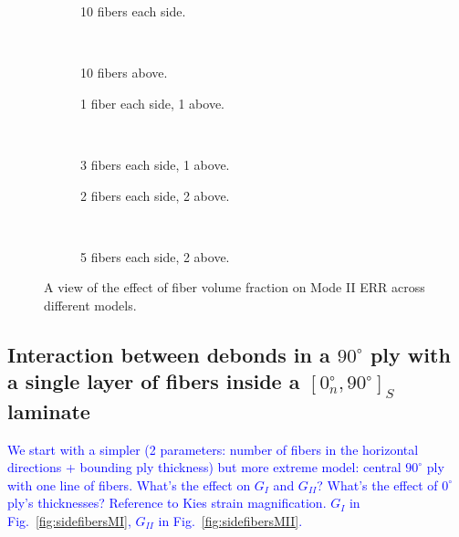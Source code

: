 \documentclass[review]{elsarticle}
\begin{document}
\begin{figure}[!h]
    \begin{subfigure}[b]{0.45\textwidth}
        \caption{10 fibers each side.}\label{subfig:volfrac10eachsideMII}
    \end{subfigure} ~
    \begin{subfigure}[b]{0.45\textwidth}
        \caption{10 fibers above.}\label{subfig:volfrac10aboveMII}
    \end{subfigure}

    \begin{subfigure}[b]{0.45\textwidth}
        \caption{1 fiber each side, 1 above.}\label{subfig:volfrac1eachside1aboveMII}
    \end{subfigure} ~
    \begin{subfigure}[b]{0.45\textwidth}
        \caption{3 fibers each side, 1 above.}\label{subfig:volfrac3eachside1aboveMII}
    \end{subfigure}

    \begin{subfigure}[b]{0.45\textwidth}
        \caption{2 fibers each side, 2 above.}\label{subfig:volfrac2eachside2aboveMII}
    \end{subfigure} ~
    \begin{subfigure}[b]{0.45\textwidth}
        \caption{5 fibers each side, 2 above.}\label{subfig:volfrac5eachside2aboveMII}
    \end{subfigure}

\caption{A view of the effect of fiber volume fraction on Mode II ERR across different models.}\label{fig:volumefractionMII}
\end{figure}

\subsection{Interaction between debonds in a $90^{\circ}$ ply with a single layer of fibers inside a $\left[0^{\circ}_{n}, 90^{\circ}\right]_{S}$ laminate}

\textcolor{blue}{We start with a simpler (2 parameters: number of fibers in the horizontal directions + bounding ply thickness) but more extreme model: central $90^{\circ}$ ply with one line of fibers. What's the effect on $G_{I}$ and $G_{II}$? What's the effect of $0^{\circ}$ ply's thicknesses? Reference to Kies strain magnification. $G_{I}$ in Fig.~\ref{fig:sidefibersMI}, $G_{II}$ in Fig.~\ref{fig:sidefibersMII}.}
\end{document}
